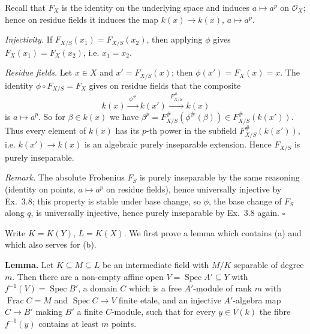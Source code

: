 \documentclass[11pt]{article}
\begin{document}
Recall that $F_X$ is the identity on the underlying space and induces $a\mapsto a^p$ on $\mathcal O_X$; hence on residue fields it induces the map $k(x)\to k(x)$, $a\mapsto a^p$.

\emph{Injectivity.} If $F_{X/S}(x_1)=F_{X/S}(x_2)$, then applying $\phi$ gives $F_X(x_1)=F_X(x_2)$, i.e. $x_1=x_2$.

\emph{Residue fields.} Let $x\in X$ and $x'=F_{X/S}(x)$; then $\phi(x')=F_X(x)=x$. The identity $\phi\circ F_{X/S}=F_X$ gives on residue fields that the composite
\[ k(x)\xrightarrow{\ \phi^\#\ }k(x')\xrightarrow{\ F_{X/S}^\#\ }k(x) \]
is $a\mapsto a^p$. So for $\beta\in k(x)$ we have $\beta^p=F^\#_{X/S}(\phi^\#(\beta))\in F^\#_{X/S}(k(x'))$. Thus every element of $k(x)$ has its $p$-th power in the subfield $F^\#_{X/S}(k(x'))$, i.e. $k(x')\to k(x)$ is an algebraic purely inseparable extension. Hence $F_{X/S}$ is purely inseparable.

\emph{Remark.} The absolute Frobenius $F_S$ is purely inseparable by the same reasoning (identity on points, $a\mapsto a^p$ on residue fields), hence universally injective by Ex.~3.8; this property is stable under base change, so $\phi$, the base change of $F_S$ along $q$, is universally injective, hence purely inseparable by Ex.~3.8 again. \hfill$\square$

\pf
Write $K=K(Y)$, $L=K(X)$. We first prove a lemma which contains (a) and which also serves for (b).

\textbf{Lemma.} Let $K\subseteq M\subseteq L$ be an intermediate field with $M/K$ separable of degree $m$. Then there are a non-empty affine open $V=\operatorname{Spec}A'\subseteq Y$ with $f^{-1}(V)=\operatorname{Spec}B'$, a domain $C$ which is a free $A'$-module of rank $m$ with $\operatorname{Frac}C=M$ and $\operatorname{Spec}C\to V$ finite etale, and an injective $A'$-algebra map $C\to B'$ making $B'$ a finite $C$-module, such that for every $y\in V(k)$ the fibre $f^{-1}(y)$ contains at least $m$ points.
\end{document}
